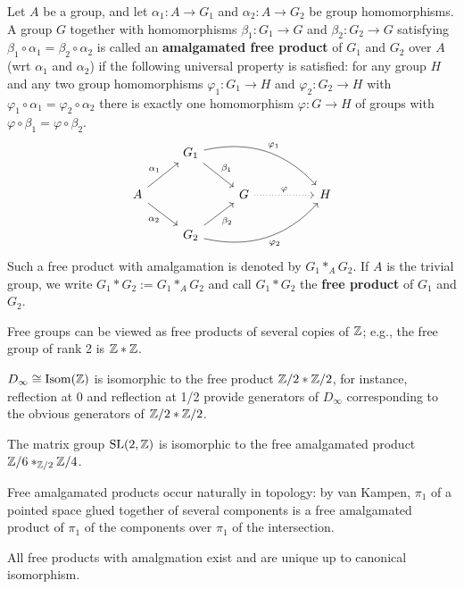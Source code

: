 \begin{definition}[]
    Let $A$ be a group, and let $\alpha_1 \colon A \to G_1$ and $\alpha _2 \colon A \to G_2$ be group homomorphisms. A group $G$ together with homomorphisms $\beta_1 \colon G_1 \to G $ and $\beta_2 \colon G_2 \to G$ satisfying $\beta_1 \circ \alpha_1= \beta_2 \circ \alpha_2$ is called an \textbf{amalgamated free product} of $G_1$ and $G_2$ over $A$ (wrt $\alpha_1$ and $\alpha_2$) if the following universal property is satisfied: for any group $H$ and any two group homomorphisms $\varphi_1 \colon G_1 \to H$ and $\varphi_2 \colon G_2 \to H$ with $\varphi_1 \circ \alpha_1 = \varphi_2 \circ \alpha_2$ there is exactly one homomorphism $\varphi  \colon G \to H$ of groups with $\varphi  \circ \beta_1 = \varphi  \circ \beta_2$.
\[
\begin{tikzcd}
                                                 & G_1 \arrow[rd, "\beta_1"] \arrow[rrrd, "\varphi_1", bend left]    &                                 &  &   \\
A \arrow[ru, "\alpha_1"] \arrow[rd, "\alpha_2"'] &                                                                   & G \arrow[rr, "\varphi", dotted] &  & H \\
                                                 & G_2 \arrow[ru, "\beta_2"'] \arrow[rrru, "\varphi_2"', bend right] &                                 &  &  
\end{tikzcd}
\] 
    Such a free product with amalgamation is denoted by $G_1 *_A G_2$. If $A$ is the trivial group, we write $G_1 * G_2 := G_1 *_A G_2$ and call $G_1 *G_2$ the \textbf{free product} of $G_1$ and $G_2$.
\end{definition}

\begin{example}
    Free groups can be viewed as free products of several copies of $\mathbb{Z}$; e.g., the free group of rank 2 is $\mathbb{Z} * \mathbb{Z}$.
\item $D _{\infty}\cong \mathrm{Isom}(\mathbb{Z})$ is isomorphic to the free product $\mathbb{Z} /2 * \mathbb{Z} /2$, for instance, reflection at 0 and reflection at 1/2 provide generators of $D _{\infty}$ corresponding to the obvious generators of $\mathbb{Z} /2 * \mathbb{Z} /2$.
\item The matrix group $\mathrm{SL}(2, \mathbb{Z})$ is isomorphic to the free amalgamated product $\mathbb{Z} /6 *_{\mathbb{Z} /2}\mathbb{Z} /4$.
\item Free amalgamated products occur naturally in topology: by van Kampen, $\pi_1$ of a pointed space glued together of several components is a free amalgamated product of $\pi_1$ of the components over $\pi_1$ of the intersection.
\end{example}
\begin{theorem}
    All free products with amalgmation exist and are unique up to canonical isomorphism.
\end{theorem}

